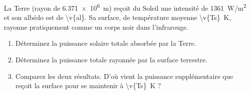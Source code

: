 La Terre (rayon de \qty{6.371e6}{m}) reçoit du Soleil une intensité de \qty{1361}{W/m^2} et son albédo est de \num{\v{al}}. Sa surface, de température moyenne \qty{\v{Ts}}{K}, rayonne pratiquement comme un corps noir dans l'infrarouge.

\begin{enumerate}[label=\alph*)]
    \item Déterminez la puissance solaire totale absorbée par la Terre.
    \item Déterminez la puissance totale rayonnée par la surface terrestre.
    \item Comparez les deux résultats. D'où vient la puissance supplémentaire que reçoit la surface pour se maintenir à \qty{\v{Ts}}{K} ?
\end{enumerate}
